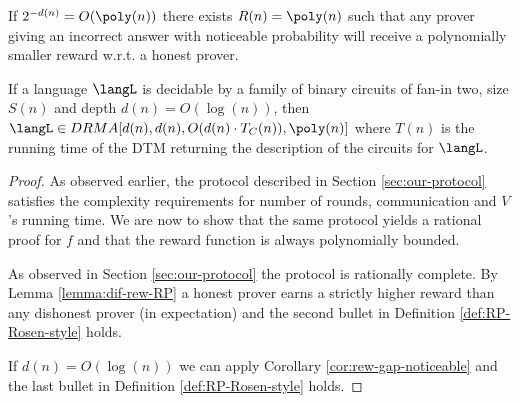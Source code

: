 \begin{mycorollary}
\label{cor:rew-gap-noticeable}
If $2^{-d(n)} = O(\poly(n))$ there exists $R(n) = \poly(n)$
such that any prover giving  an incorrect  answer with 
noticeable probability will receive a polynomially smaller reward w.r.t. a 
honest prover.
\end{mycorollary}


\begin{mythm}
If a language $\langL$ is decidable by a family of 
binary circuits of fan-in two, size $S(n)$ and 
depth $d(n) = O(\log(n))$, then $\langL \in DRMA[d(n), d(n), O(d(n)\cdot 
T_{C}(n)), 
\poly(n)]$ 
where $T(n)$ is the running time of the DTM returning the 
description of the circuits for $\langL$. 
\end{mythm}
\begin{proof}
As observed earlier, the protocol described in Section \ref{sec:our-protocol} 
satisfies the complexity requirements for number of rounds, communication and 
$V$'s running time.
We are now to show that the same protocol yields a rational proof for $f$ and 
that the reward function is always polynomially bounded.

As observed in Section \ref{sec:our-protocol} the protocol is rationally 
complete. By Lemma \ref{lemma:dif-rew-RP} a honest prover earns a strictly 
higher reward than any dishonest prover (in expectation) and the second bullet 
in Definition \ref{def:RP-Rosen-style} holds.

If $d(n) = O(\log(n))$  we can apply Corollary 
\ref{cor:rew-gap-noticeable} and the last bullet in Definition 
\ref{def:RP-Rosen-style} holds.

\end{proof}

